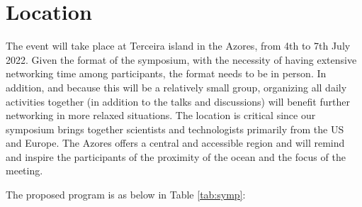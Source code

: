 \section{Location}

The event will take place at Terceira island in the Azores, from 4th to
7th July 2022. Given the format of the symposium, with the necessity of
having extensive networking time among participants, the format needs to
be in person. In addition, and because this will be a relatively small
group, organizing all daily activities together (in addition to the
talks and discussions) will benefit further networking in more relaxed
situations. The location is critical since our symposium brings together
scientists and technologists primarily from the US and Europe. The
Azores offers a central and accessible region and will remind and
inspire the participants of the proximity of the ocean and the focus of
the meeting.

The proposed program is as below in Table \ref{tab:symp}:

